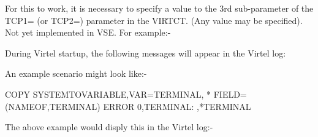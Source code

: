 \documentclass[letterpaper,10pt,english]{sphinxmanual}
\begin{document}

For this to work, it is necessary to specify a value to the 3rd sub-parameter of the TCP1= (or TCP2=) parameter in the VIRTCT. (Any value may be specified). Not yet implemented in VSE. For example:-

\begin{sphinxVerbatim}[commandchars=\\\{\}]
\end{sphinxVerbatim}

During Virtel startup, the following messages will appear in the Virtel log:

\begin{sphinxVerbatim}[commandchars=\\\{\}]
           
      
\end{sphinxVerbatim}

An example scenario might look like:-

\begin{sphinxVerbatim}[commandchars=\\\{\}]
COPY\PYGZdl{} SYSTEM\PYGZhy{}TO\PYGZhy{}VARIABLE,VAR=\PYGZsq{}TERMINAL\PYGZsq{},                      *
      FIELD=(NAME\PYGZhy{}OF,TERMINAL)
ERROR\PYGZdl{} 0,\PYGZsq{}TERMINAL: \PYGZsq{},\PYGZsq{}*TERMINAL\PYGZsq{}
\end{sphinxVerbatim}

The above example would disply this in the Virtel log:-

\begin{sphinxVerbatim}[commandchars=\\\{\}]
     
 
\end{sphinxVerbatim}


\begin{sphinxVerbatim}[commandchars=\\\{\}]
 
\end{sphinxVerbatim}
\end{document}
